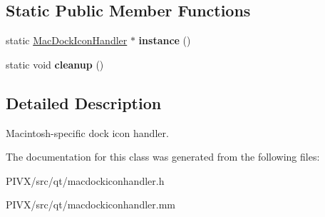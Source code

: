 \subsection*{Static Public Member Functions}
\begin{DoxyCompactItemize}
\item 
\mbox{\label{class_mac_dock_icon_handler_afd3ef7126d0b6ef02eaf85e5455fe6f4}} 
static \mbox{\hyperlink{class_mac_dock_icon_handler}{Mac\+Dock\+Icon\+Handler}} $\ast$ {\bfseries instance} ()
\item 
\mbox{\label{class_mac_dock_icon_handler_aee1895384db9ebce8365d0fd7decc9db}} 
static void {\bfseries cleanup} ()
\end{DoxyCompactItemize}


\subsection{Detailed Description}
Macintosh-\/specific dock icon handler. 

The documentation for this class was generated from the following files\+:\begin{DoxyCompactItemize}
\item 
P\+I\+V\+X/src/qt/macdockiconhandler.\+h\item 
P\+I\+V\+X/src/qt/macdockiconhandler.\+mm\end{DoxyCompactItemize}
